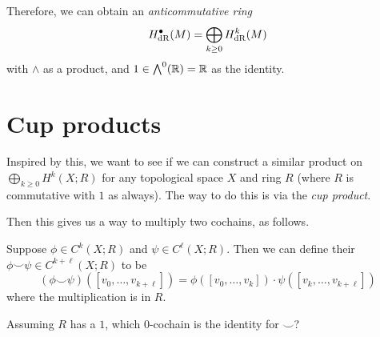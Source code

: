 Therefore, we can obtain an \emph{anticommutative ring}
\[ H_{\mathrm{dR}}^\bullet(M) = \bigoplus_{k \ge 0} H_{\mathrm{dR}}^k(M) \]
with $\wedge$ as a product, and $1 \in \bigwedge^0(\mathbb R) = \mathbb R$ as the identity.

\section{Cup products}
Inspired by this, we want to see if we can construct a similar product
on $\bigoplus_{k \ge 0} H^k(X; R)$ for any topological space $X$ and ring $R$
(where $R$ is commutative with $1$ as always).
The way to do this is via the \emph{cup product}.

Then this gives us a way to multiply two cochains, as follows.
\begin{definition}
	Suppose $\phi \in C^k(X;R)$ and $\psi \in C^\ell(X;R)$.
	Then we can define their 
	$\phi\smile\psi \in C^{k+\ell}(X;R)$ to be
	\[
		(\phi\smile\psi)([v_0, \dots, v_{k+\ell}])
		=
		\phi\left( [v_0, \dots, v_k] \right)
		\cdot
		\psi\left( [v_k, \dots, v_{k+\ell}] \right)
	\]
	where the multiplication is in $R$.
\end{definition}

\begin{ques}
	Assuming $R$ has a $1$, which $0$-cochain is the identity for $\smile$?
\end{ques}

